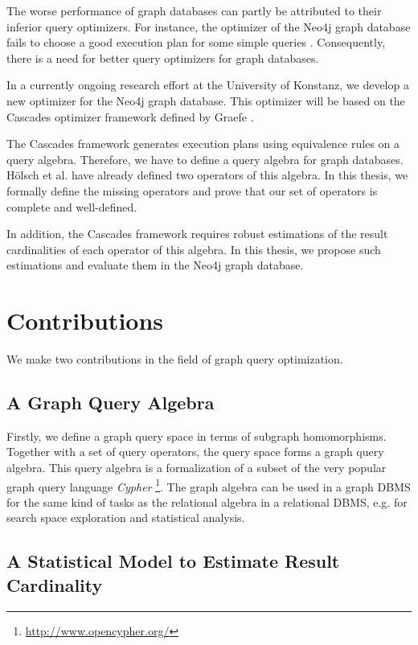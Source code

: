The worse performance of graph databases can partly be attributed to their
inferior query optimizers.
For instance, the optimizer of the Neo4j graph database fails to
choose a good execution plan for some simple queries \cite{holsch_algebra_2016}.
Consequently, there is a need for better query optimizers for graph databases.

In a currently ongoing research effort at the University of Konstanz, we
develop a new optimizer for the Neo4j graph database.
This optimizer will be based on the Cascades optimizer framework defined by
Graefe \cite{graefe_cascades_1995}.

The Cascades framework generates execution plans using equivalence rules on
a query algebra. Therefore, we have to define a query algebra for graph
databases. Hölsch et al.\cite{holsch_algebra_2016} have already defined two
operators of this algebra.
In this thesis, we formally define the missing operators and prove that our set of
operators is complete and well-defined.

In addition, the Cascades framework requires robust estimations of the result
cardinalities of each operator of this algebra. In this thesis, we propose
such estimations and evaluate them in the Neo4j graph database.

\section{Contributions}

We make two contributions in the field of graph query
optimization.

\subsection{A Graph Query Algebra}

Firstly, we define a graph query space in terms of subgraph homomorphisms.
Together with a set of query operators, the query space forms a graph query
algebra.
This query algebra is a formalization of a subset of the very popular
graph query language \emph{Cypher} \footnote{\url{http://www.opencypher.org/}}.
The graph algebra can be used in a graph DBMS for the same kind of tasks as
the relational algebra in a relational DBMS, e.g. for search space exploration
and statistical analysis.

\subsection{A Statistical Model to Estimate Result Cardinality}

